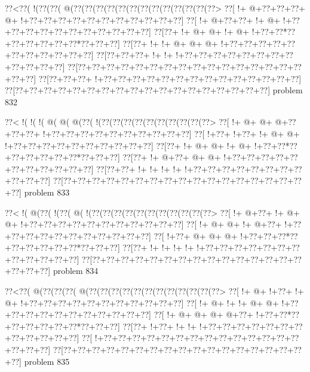 \vbox{\vbox{\goo
\0??<\0??(\- !(\0??(\0??(\- @(\0??(\0??(\0??(\0??(\0??(\0??(\0??(\0??(\0??(\0??(\0??(\0??(\0??>
\0??[\- !+\- @+\0??+\0??+\0??+\- @+\- !+\0??+\0??+\0??+\0??+\0??+\0??+\0??+\0??+\0??+\0??+\0??]
\0??[\- !+\- @+\0??+\0??+\- !+\- @+\- !+\0??+\0??+\0??+\0??+\0??+\0??+\0??+\0??+\0??+\0??+\0??]
\0??[\0??+\- !+\- @+\- @+\- !+\- @+\- !+\0??+\0??*\0??+\0??+\0??+\0??+\0??+\0??*\0??+\0??+\0??]
\0??[\0??+\- !+\- !+\- @+\- @+\- @+\- !+\0??+\0??+\0??+\0??+\0??+\0??+\0??+\0??+\0??+\0??+\0??]
\0??[\0??+\0??+\0??+\- !+\- !+\- !+\0??+\0??+\0??+\0??+\0??+\0??+\0??+\0??+\0??+\0??+\0??+\0??]
\0??[\0??+\0??+\0??+\0??+\0??+\0??+\0??+\0??+\0??+\0??+\0??+\0??+\0??+\0??+\0??+\0??+\0??+\0??]
\0??[\0??+\0??+\0??+\- !+\0??+\0??+\0??+\0??+\0??+\0??+\0??+\0??+\0??+\0??+\0??+\0??+\0??+\0??]
\0??[\0??+\0??+\0??+\0??+\0??+\0??+\0??+\0??+\0??+\0??+\0??+\0??+\0??+\0??+\0??+\0??+\0??+\0??]
}
\hfil problem 832\hfil\break
}



\vbox{\vbox{\goo
\0??<\- !(\- !(\- !(\- @(\- @(\- @(\0??(\- !(\0??(\0??(\0??(\0??(\0??(\0??(\0??(\0??(\0??(\0??>
\0??[\- !+\- @+\- @+\- @+\0??+\0??+\0??+\- !+\0??+\0??+\0??+\0??+\0??+\0??+\0??+\0??+\0??+\0??]
\0??[\- !+\0??+\- !+\0??+\- !+\- @+\- @+\- !+\0??+\0??+\0??+\0??+\0??+\0??+\0??+\0??+\0??+\0??]
\0??[\0??+\- !+\- @+\- @+\- !+\- @+\- !+\0??+\0??*\0??+\0??+\0??+\0??+\0??+\0??*\0??+\0??+\0??]
\0??[\0??+\- !+\- @+\0??+\- @+\- @+\- !+\0??+\0??+\0??+\0??+\0??+\0??+\0??+\0??+\0??+\0??+\0??]
\0??[\0??+\0??+\- !+\- !+\- !+\- !+\- !+\0??+\0??+\0??+\0??+\0??+\0??+\0??+\0??+\0??+\0??+\0??]
\0??[\0??+\0??+\0??+\0??+\0??+\0??+\0??+\0??+\0??+\0??+\0??+\0??+\0??+\0??+\0??+\0??+\0??+\0??]
}
\hfil problem 833\hfil\break
}



\vbox{\vbox{\goo
\0??<\- !(\- @(\0??(\- !(\0??(\- @(\- !(\0??(\0??(\0??(\0??(\0??(\0??(\0??(\0??(\0??(\0??(\0??>
\0??[\- !+\- @+\0??+\- !+\- @+\- @+\- !+\0??+\0??+\0??+\0??+\0??+\0??+\0??+\0??+\0??+\0??+\0??]
\0??[\- !+\- @+\- @+\- !+\- @+\0??+\- !+\0??+\0??+\0??+\0??+\0??+\0??+\0??+\0??+\0??+\0??+\0??]
\0??[\- !+\0??+\- @+\- @+\- @+\- !+\0??+\0??+\0??*\0??+\0??+\0??+\0??+\0??+\0??*\0??+\0??+\0??]
\0??[\0??+\- !+\- !+\- !+\- !+\- !+\0??+\0??+\0??+\0??+\0??+\0??+\0??+\0??+\0??+\0??+\0??+\0??]
\0??[\0??+\0??+\0??+\0??+\0??+\0??+\0??+\0??+\0??+\0??+\0??+\0??+\0??+\0??+\0??+\0??+\0??+\0??]
}
\hfil problem 834\hfil\break
}



\vbox{\vbox{\goo
\0??<\0??(\- @(\0??(\0??(\0??(\- @(\0??(\0??(\0??(\0??(\0??(\0??(\0??(\0??(\0??(\0??(\0??(\0??>
\0??[\- !+\- @+\- !+\0??+\- !+\- @+\- !+\0??+\0??+\0??+\0??+\0??+\0??+\0??+\0??+\0??+\0??+\0??]
\0??[\- !+\- @+\- !+\- !+\- @+\- @+\- !+\0??+\0??+\0??+\0??+\0??+\0??+\0??+\0??+\0??+\0??+\0??]
\0??[\- !+\- @+\- @+\- @+\- @+\0??+\- !+\0??+\0??*\0??+\0??+\0??+\0??+\0??+\0??*\0??+\0??+\0??]
\0??[\0??+\- !+\0??+\- !+\- !+\- !+\0??+\0??+\0??+\0??+\0??+\0??+\0??+\0??+\0??+\0??+\0??+\0??]
\0??[\- !+\0??+\0??+\0??+\0??+\0??+\0??+\0??+\0??+\0??+\0??+\0??+\0??+\0??+\0??+\0??+\0??+\0??]
\0??[\0??+\0??+\0??+\0??+\0??+\0??+\0??+\0??+\0??+\0??+\0??+\0??+\0??+\0??+\0??+\0??+\0??+\0??]
}
\hfil problem 835\hfil\break
}



